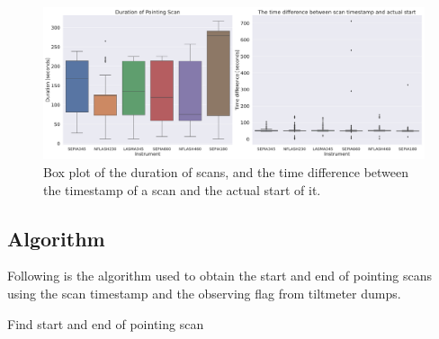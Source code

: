 \begin{figure}[H]
    \centering
    \includegraphics[width=1.1\textwidth]{Tiltmeter plots/scan_duration_distribution_rx.pdf}
    \caption{Box plot of the duration of scans, and the time difference between the timestamp of a scan and the actual start of it.}
    \label{fig:scan_times_box}
\end{figure}


\subsection{Algorithm}
Following is the algorithm used to obtain the start and end of pointing scans using the scan timestamp and the observing flag from tiltmeter dumps.

\begin{algorithm}[H]
    \caption{Find start and end of pointing scan}
    \label{alg:scan_times}
    \begin{algorithmic}
            \Else
            \EndIf
        \EndFor
        \\
                \EndIf
                \EndIf
            \EndFor
        \EndFor
    \end{algorithmic}
\end{algorithm} 


